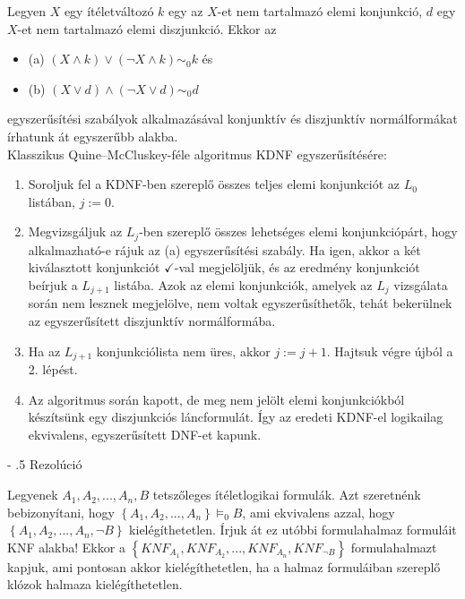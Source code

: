 \documentclass[margin=0px]{article}
\makeatletter
\renewcommand\paragraph{%
	\@startsection{paragraph}{4}{0mm}%
	{-\baselineskip}%
	{.5\baselineskip}%
	{\normalfont\normalsize\bfseries}}
\makeatother
\begin{document}
Legyen $X$ egy ítéletváltozó $k$ egy az $X$-et nem tartalmazó elemi konjunkció, $d$ egy $X$-et nem tartalmazó elemi
diszjunkció. Ekkor az

\begin{itemize}
    \item	(a) $(X \wedge k) \vee (\neg X \wedge k) \sim_{0} k $ és

    \item	(b) $(X \vee d) \wedge (\neg X \vee d) \sim_{0} d $
\end{itemize}

egyszerűsítési szabályok alkalmazásával konjunktív és diszjunktív normálformákat írhatunk át egyszerűbb alakba.\\

\noindent Klasszikus Quine--McCluskey-féle algoritmus KDNF egyszerűsítésére:

\begin{enumerate}
    \item	Soroljuk fel a KDNF-ben szereplő összes teljes elemi konjunkciót az $L_{0}$ listában, $j:=0$.

    \item	Megvizsgáljuk az $L_{j}$-ben szereplő összes lehetséges elemi konjunkciópárt, hogy alkalmazható-e
          rájuk az (a) egyszerűsítési szabály. Ha igen, akkor a két kiválasztott konjunkciót $\checkmark$-val megjelöljük,
          és az eredmény konjunkciót beírjuk a $L_{j+1}$ listába. Azok az elemi konjunkciók, amelyek az $L_{j}$ vizsgálata
          során nem lesznek megjelölve, nem voltak egyszerűsíthetők, tehát bekerülnek az egyszerűsített diszjunktív
          normálformába.

    \item	Ha az $L_{j+1}$ konjunkciólista nem üres, akkor $j:=j+1$. Hajtsuk végre újból a 2. lépést.

    \item	Az algoritmus során kapott, de meg nem jelölt elemi konjunkciókból készítsünk egy diszjunkciós
          láncformulát. Így az eredeti KDNF-el logikailag ekvivalens, egyszerűsített DNF-et kapunk.
\end{enumerate}

\paragraph{Rezolúció}

Legyenek $A_{1}, A_{2}, ... , A_{n}, B$ tetszőleges ítéletlogikai formulák.
Azt szeretnénk bebizonyítani, hogy $\left\{A_{1}, A_{2}, ... , A_{n}\right\} \models_{0} B$,
ami ekvivalens azzal, hogy $\left\{A_{1}, A_{2}, ... , A_{n}, \neg B\right\}$ kielégíthetetlen.
Írjuk át ez utóbbi formulahalmaz formuláit KNF alakba! Ekkor a
$\left\{KNF_{A_{1}}, KNF_{A_{2}}, ... , KNF_{A_{n}}, KNF_{\neg B}\right\}$ formulahalmazt
kapjuk, ami pontosan akkor kielégíthetetlen, ha a halmaz formuláiban szereplő klózok halmaza
kielégíthetetlen.
\end{document}
